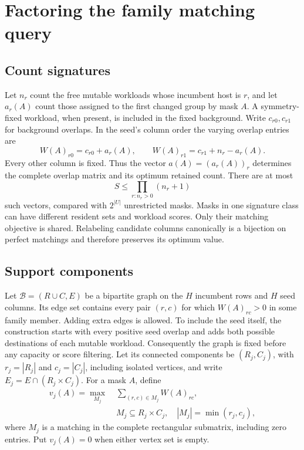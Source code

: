 \documentclass[11pt]{article}
\begin{document}
\section{Factoring the family matching query}
\subsection{Count signatures}
Let $n_r$ count the free mutable workloads whose incumbent host is $r$, and let $a_r(A)$ count those assigned to the first changed group by mask $A$. A symmetry-fixed workload, when present, is included in the fixed background. Write $c_{r0},c_{r1}$ for background overlaps. In the seed's column order the varying overlap entries are
\begin{equation}
W(A)_{r0}=c_{r0}+a_r(A),\qquad W(A)_{r1}=c_{r1}+n_r-a_r(A).
\label{eq:signature-columns}
\end{equation}
Every other column is fixed. Thus the vector $a(A)=(a_r(A))_r$ determines the complete overlap matrix and its optimum retained count. There are at most
\begin{equation}
S\le\prod_{r:n_r>0}(n_r+1)
\label{eq:signature-count}
\end{equation}
such vectors, compared with $2^{|U|}$ unrestricted masks. Masks in one signature class can have different resident sets and workload scores. Only their matching objective is shared. Relabeling candidate columns canonically is a bijection on perfect matchings and therefore preserves its optimum value.

\subsection{Support components}
Let $\mathcal B=(R\cup C,E)$ be a bipartite graph on the $H$ incumbent rows and $H$ seed columns. Its edge set contains every pair $(r,c)$ for which $W(A)_{rc}>0$ in some family member. Adding extra edges is allowed. To include the seed itself, the construction starts with every positive seed overlap and adds both possible destinations of each mutable workload. Consequently the graph is fixed before any capacity or score filtering. Let its connected components be $(R_j,C_j)$, with $r_j=|R_j|$ and $c_j=|C_j|$, including isolated vertices, and write $E_j=E\cap(R_j\times C_j)$. For a mask $A$, define
\begin{equation}
\begin{split}
v_j(A)=\max_{M_j}\;&\sum_{(r,c)\in M_j}W(A)_{rc},\\
& M_j\subseteq R_j\times C_j,\quad |M_j|=\min(r_j,c_j),
\end{split}
\label{eq:component-optimum}
\end{equation}
where $M_j$ is a matching in the complete rectangular submatrix, including zero entries. Put $v_j(A)=0$ when either vertex set is empty.
\end{document}
